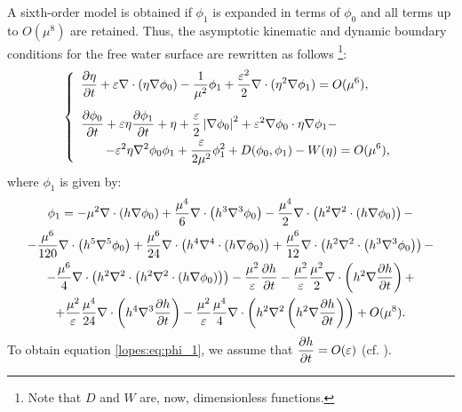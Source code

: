 A sixth-order model is obtained if
 \(\phi_1\) is expanded in terms of \(\phi_0\) and all terms
up to \(O(\mu^8)\) are retained.
Thus,  the asymptotic kinematic and dynamic
boundary conditions for the free water surface  are
rewritten as
 follows \footnote{Note that \(D\)
and \(W\) are, now,   dimensionless functions.}:
\begin{equation}\label{lopes:eq:kindyn}
\renewcommand{\arraystretch}{1.7}
\left\{\begin{array}{l}
\displaystyle\fpar{\eta}{t}+\varepsilon\nabla\cdot(\eta\nabla\phi_0)-\frac{1}{\mu^2}\phi_1+
\frac{\varepsilon^2}{2}\nabla\cdot(\eta^2\nabla\phi_1)=O(\mu^{6}),
\vspace{0.3cm}
\\
\displaystyle \fpar{\phi_0}{t}+\varepsilon\eta\fpar{\phi_1}{t}+\eta +
\frac{\varepsilon}{2} \left|\nabla\phi_0\right|^2+\varepsilon^2\nabla\phi_0\cdot\eta\nabla\phi_1-\\
\displaystyle \qquad -\varepsilon^2\eta\nabla^2\phi_0\phi_1
+\frac{\varepsilon}{2\mu^2}\phi_1^2
+D(\phi_0,\phi_1)-W(\eta)
=O(\mu^{6}),
\end{array}\right .
\end{equation}
where \(\phi_1\) is given by:
\begin{multline}\label{lopes:eq:phi_1}
\phi_1=
-\mu^{2}\nabla\cdot\left(h\nabla\phi_0\right)
+\frac{\mu^{4}}{6}\nabla\cdot\left(h^3\nabla^3\phi_0\right)
-\frac{\mu^{4}}{2}\nabla\cdot\left(h^2
\nabla^2\cdot\left(h\nabla\phi_0\right) \right)-\\
-\frac{\mu^6}{120}\nabla\cdot\left(h^5\nabla^5\phi_0\right)+
\frac{\mu^6}{24}\nabla\cdot\left(h^4\nabla^4\cdot\left(h\nabla\phi_0\right)\right)+\frac{\mu^6}{12}\nabla\cdot\left(h^2\nabla^2\cdot\left(h^3\nabla^3\phi_0\right)\right)-\\
-\frac{\mu^6}{4}\nabla\cdot\left(h^2\nabla^2\cdot\left(h^2\nabla^2\cdot\left(h\nabla\phi_0\right)\right)\right)
-\frac{\mu^2}{\varepsilon}\frac{\partial h}{\partial t}-
\frac{\mu^2}{\varepsilon}\frac{\mu^2}{2}\nabla\cdot\left(h^2\nabla\frac{\partial h}{\partial t}\right)+\\
+\frac{\mu^2}{\varepsilon}\frac{\mu^4}{24}\nabla\cdot\left(h^4\nabla^3
\frac{\partial h}{\partial t}\right)
-\frac{\mu^2}{\varepsilon}\frac{\mu^4}{4}\nabla\cdot\left(h^2\nabla^2\left(h^2\nabla\frac{\partial h}{\partial t}\right)\right)+O(\mu^{8}).
\end{multline}
To obtain equation \eqref{lopes:eq:phi_1}, we assume
that \(\displaystyle\frac{\partial h}{\partial t}=O(\varepsilon)\) (cf. \cite{DutykhDias2007}).


